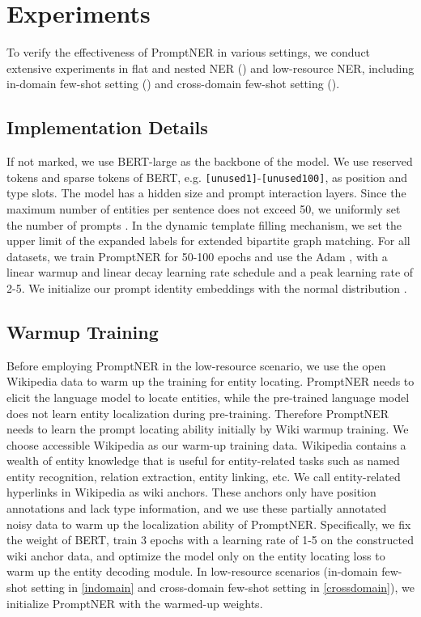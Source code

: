 \documentclass[11pt]{article}
\begin{document}
\section{Experiments}

To verify the effectiveness of PromptNER in various settings, we conduct extensive experiments in flat and nested NER () and low-resource NER, including in-domain few-shot setting () and cross-domain few-shot setting ().

\subsection{Implementation Details} If not marked, we use BERT-large \citep{devlin-etal-2019-bert} as the backbone of the model. We use reserved tokens and sparse tokens of BERT, e.g. \texttt{[unused1]}-\texttt{[unused100]}, as position and type slots. 
The model has a hidden size  and  prompt interaction layers. 
Since the maximum number of entities per sentence does not exceed 50, we uniformly set the number of prompts . In the dynamic template filling mechanism, we set the upper limit of the expanded labels  for extended bipartite graph matching. For all datasets, we train PromptNER for 50-100 epochs and use the Adam \citep{adam}, with a linear warmup and linear decay learning rate schedule and a peak learning rate of 2-5. We initialize our prompt identity embeddings  with the normal distribution . 


\subsection{Warmup Training}


Before employing PromptNER in the low-resource scenario, we use the open Wikipedia data to warm up the training for entity locating. PromptNER needs to elicit the language model to locate entities, while the pre-trained language model does not learn entity localization during pre-training. Therefore PromptNER needs to learn the prompt locating ability initially by Wiki warmup training. We choose accessible Wikipedia as our warm-up training data. Wikipedia contains a wealth of entity knowledge \citep{yamada-etal-2020-luke, wang2022damonlp} that is useful for entity-related tasks such as named entity recognition, relation extraction, entity linking, etc. 
We call entity-related hyperlinks in Wikipedia as wiki anchors.
These anchors only have position annotations and lack type information, and we use these partially annotated noisy data to warm up the localization ability of PromptNER. Specifically, we fix the weight of BERT, train 3 epochs with a learning rate of 1-5 on the constructed wiki anchor data, and optimize the model only on the entity locating loss to warm up the entity decoding module. In low-resource scenarios (in-domain few-shot setting in \cref{indomain} and cross-domain few-shot setting in \cref{crossdomain}), we initialize PromptNER with the warmed-up weights.
\end{document}
